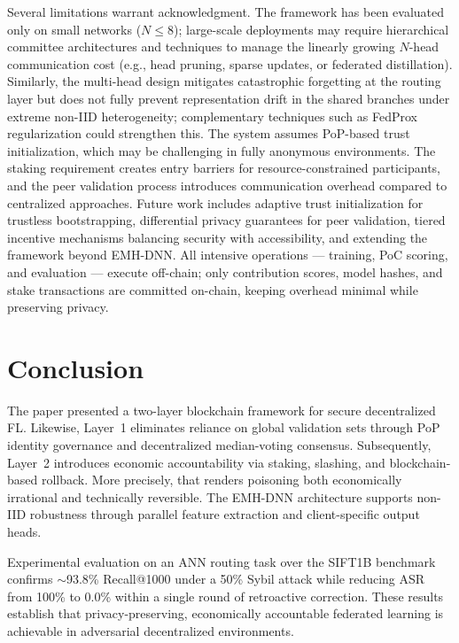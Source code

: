 \documentclass[conference]{IEEEtran}
\begin{document}
Several limitations warrant acknowledgment. The framework has been evaluated only on small networks ($N \leq 8$); large-scale deployments may require hierarchical committee architectures and techniques to manage the linearly growing $N$-head communication cost (e.g., head pruning, sparse updates, or federated distillation). Similarly, the multi-head design mitigates catastrophic forgetting at the routing layer but does not fully prevent representation drift in the shared branches under extreme non-IID heterogeneity; complementary techniques such as FedProx regularization could strengthen this. The system assumes PoP-based trust initialization, which may be challenging in fully anonymous environments. The staking requirement creates entry barriers for resource-constrained participants, and the peer validation process introduces communication overhead compared to centralized approaches. Future work includes adaptive trust initialization for trustless bootstrapping, differential privacy guarantees for peer validation, tiered incentive mechanisms balancing security with accessibility, and extending the framework beyond EMH-DNN. All intensive operations — training, PoC scoring, and evaluation — execute off-chain; only contribution scores, model hashes, and stake transactions are committed on-chain, keeping overhead minimal while preserving privacy.

\section{Conclusion}

The paper presented a two-layer blockchain framework for secure decentralized FL. Likewise, Layer~1 eliminates reliance on global validation sets through PoP identity governance and decentralized median-voting consensus. Subsequently, Layer~2 introduces economic accountability via staking, slashing, and blockchain-based rollback. More precisely, that renders poisoning both economically irrational and technically reversible. The EMH-DNN architecture supports non-IID robustness through parallel feature extraction and client-specific output heads.

Experimental evaluation on an ANN routing task over the SIFT1B benchmark confirms $\sim$93.8\% Recall@1000 under a 50\% Sybil attack while reducing ASR from 100\% to 0.0\% within a single round of retroactive correction. These results establish that privacy-preserving, economically accountable federated learning is achievable in adversarial decentralized environments.
\end{document}
